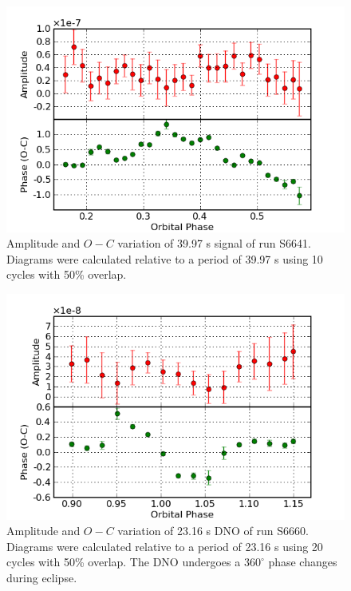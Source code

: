 \begin{figure}
 \centering
 \includegraphics[bb=0 0 600 400,width=0.85\columnwidth]{images/archive_phot/S6641/S6641d_39.97.png}
 \caption[S6641 $O-C$ diagram of 39.97 s signal]{Amplitude and $O-C$ variation of 39.97 s signal of run S6641. Diagrams were calculated relative to a period of 39.97 s using 10 cycles with 50\% overlap. }
 \label{S6641_39.97}
\end{figure}



\begin{figure}
 \centering
 \includegraphics[bb=0 0 600 400,width=0.85\columnwidth]{images/archive_phot/S6660/SS6660d_23.16.fixed.png}
 \caption[S6660 $O-C$ diagram of 23.16 s DNO]{Amplitude and $O-C$ variation of 23.16 s DNO of run S6660. Diagrams were calculated relative to a period of 23.16 s using 20 cycles with 50\% overlap. The DNO undergoes a $360^{\circ}$ phase changes during eclipse.}
 \label{S6660_23.16}
\end{figure}


